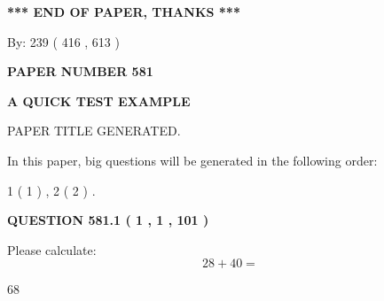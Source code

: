 \documentclass[12pt]{article}
\begin{document}
   
   
   
\vspace{1.0in} 
{\textbf{\large{ *** END OF PAPER, THANKS *** }}} 
   
   
\hspace{1.0in} By: 
 239 ( 416 ,  613 )
   
   
   
   
\newpage 
\setcounter{page}{ 
   581001 } 
   
   
   
   
 {\textbf{ \Large{ PAPER NUMBER  581  }}}
   
   
\vspace{0.2in}
   
   
   
   
   
   
   
   
 \vspace{0.2in}
{\LARGE {\textbf{ A QUICK TEST EXAMPLE}}}
   
   
 PAPER TITLE GENERATED.
   
   
   
\vspace{0.2in}
   
In this paper, big questions will be generated in the following order: 
   
   
   1 ( 1 )
 ,
   2 ( 2 )
 .
  
\vspace{0.2in}
  
{\textbf{\Large{QUESTION
581.1 
 ( 1 , 1 , 101 )
}}}
  
  
 
Please calculate:
\begin{equation}
28 +  %
40 = \nonumber
\end{equation}
 
 
 
\noindent{}
 
 

68
 
 
\noindent{}
 
 

 
 
 
\noindent{}
 
\end{document}
